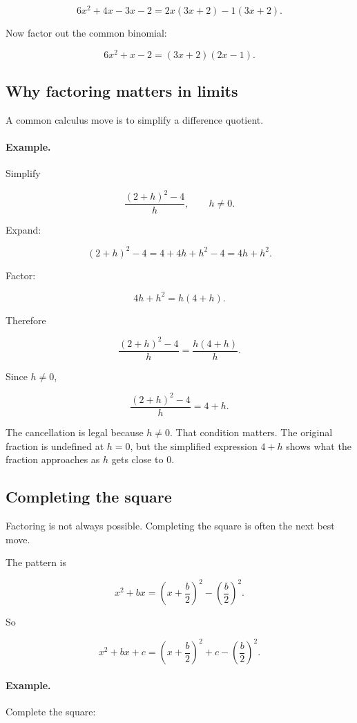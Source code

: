 \[
6x^2+4x-3x-2
=
2x(3x+2)-1(3x+2).
\]

Now factor out the common binomial:

\[
\boxed{
6x^2+x-2=(3x+2)(2x-1).
}
\]

\subsection{Why factoring matters in limits}
\label{appsubsec:factoring-limits}

A common calculus move is to simplify a difference quotient.

\paragraph{Example.}
Simplify

\[
\frac{(2+h)^2-4}{h},
\qquad h\neq0.
\]

Expand:

\[
(2+h)^2-4=4+4h+h^2-4=4h+h^2.
\]

Factor:

\[
4h+h^2=h(4+h).
\]

Therefore

\[
\frac{(2+h)^2-4}{h}
=
\frac{h(4+h)}{h}.
\]

Since \(h\neq0\),

\[
\boxed{
\frac{(2+h)^2-4}{h}=4+h.
}
\]

The cancellation is legal because \(h\neq0\).  That condition matters.  The original
fraction is undefined at \(h=0\), but the simplified expression \(4+h\) shows what the
fraction approaches as \(h\) gets close to \(0\).

\subsection{Completing the square}
\label{appsubsec:completing-square}

Factoring is not always possible.  Completing the square is often the next best move.

The pattern is

\[
x^2+bx
=
\left(x+\frac b2\right)^2-\left(\frac b2\right)^2.
\]

So

\[
\boxed{
x^2+bx+c
=
\left(x+\frac b2\right)^2+c-\left(\frac b2\right)^2.
}
\]

\paragraph{Example.}
Complete the square:

